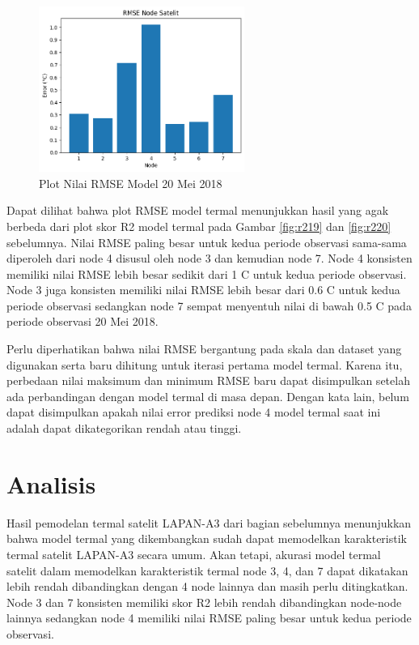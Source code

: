 \begin{figure}[H]
\setlength{}
\begin{center}
\includegraphics[width=0.6\textwidth]{fig/rmse_2018-05-20.png}
\caption{Plot Nilai RMSE Model 20 Mei 2018}
\label{fig:rmse20}
\end{center}
\end{figure}

Dapat dilihat bahwa plot RMSE model termal menunjukkan hasil yang agak berbeda
dari plot skor R2 model termal pada Gambar \ref{fig:r219} dan \ref{fig:r220}
sebelumnya. Nilai RMSE paling besar untuk kedua periode observasi sama-sama
diperoleh dari node 4 disusul oleh node 3 dan kemudian node 7. Node 4 konsisten
memiliki nilai RMSE lebih besar sedikit dari 1 \degree C untuk kedua periode
observasi. Node 3 juga konsisten memiliki nilai RMSE lebih besar dari 0.6
\degree C untuk kedua periode observasi sedangkan node 7 sempat menyentuh nilai
di bawah 0.5 \degree C pada periode observasi 20 Mei 2018.

Perlu diperhatikan bahwa nilai RMSE bergantung pada skala dan dataset yang
digunakan serta baru dihitung untuk iterasi pertama model termal. Karena itu,
perbedaan nilai maksimum dan minimum RMSE baru dapat disimpulkan setelah ada
perbandingan dengan model termal di masa depan. Dengan kata lain, belum dapat
disimpulkan apakah nilai error prediksi node 4 model termal saat
ini adalah dapat dikategorikan rendah atau tinggi.

\section{Analisis}

Hasil pemodelan termal satelit LAPAN-A3 dari bagian sebelumnya menunjukkan
bahwa model termal yang dikembangkan sudah dapat memodelkan karakteristik
termal satelit LAPAN-A3 secara umum. Akan tetapi, akurasi model termal satelit
dalam memodelkan karakteristik termal node 3, 4, dan 7 dapat dikatakan lebih
rendah dibandingkan dengan 4 node lainnya dan masih perlu ditingkatkan. Node 3
dan 7 konsisten memiliki skor R2 lebih rendah dibandingkan node-node lainnya
sedangkan node 4 memiliki nilai RMSE paling besar untuk kedua periode
observasi.


